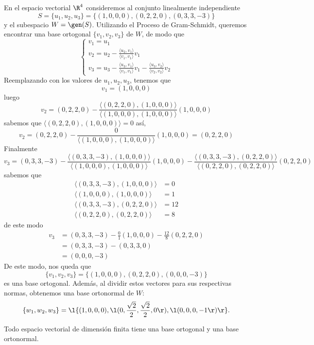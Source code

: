 \documentclass[compacto,10pt]{pubciencias-notas}
\begin{document}
\begin{ejem}\hspace{0pt} En el espacio vectorial $\R^{4}$ consideremos al conjunto linealmente independiente  
\[
    S = \{u_{1}, u_{2}, u_{3}\} = \{(1,0,0,0), (0,2,2,0), (0, 3, 3, - 3)\}
\]
y el subespacio $W = \gen(S)$. Utilizando el Proceso de Gram-Schmidt, queremos encontrar una base ortogonal $\{v_{1}, v_{2}, v_{3}\}$  de $W$, de modo que \[
\begin{cases}
    v_1=u_1\\
    v_2=u_2-\frac{\langle u_2,v_1\rangle}{\langle v_1,v_1\rangle}v_1\\
    v_3=u_3-\frac{\langle u_3,v_1\rangle}{\langle v_1,v_1\rangle}v_1-\frac{\langle u_3,v_2\rangle}{\langle v_2,v_2\rangle}v_2
\end{cases}
\] 
Reemplazando con los valores de $u_{1}, u_{2}, u_{3}$, tenemos que 
\[
v_1=(1,0,0,0)
\]
luego \[
v_2=(0,2,2,0)-\frac{\langle (0,2,2,0),(1,0,0,0)\rangle}{\langle (1,0,0,0),(1,0,0,0)\rangle}(1,0,0,0)
\]
sabemos que $\langle (0,2,2,0),(1,0,0,0)\rangle=0$ así,
\[
v_2=(0,2,2,0)-\frac{0}{\langle (1,0,0,0),(1,0,0,0)\rangle}(1,0,0,0)=(0,2,2,0)
\]
Finalmente 
\[
v_3=(0, 3, 3, - 3)-\frac{\langle (0, 3, 3, - 3),(1,0,0,0)\rangle}{\langle (1,0,0,0),(1,0,0,0)\rangle}(1,0,0,0)-\frac{\langle (0, 3, 3, - 3),(0,2,2,0)\rangle}{\langle (0,2,2,0),(0,2,2,0)\rangle}(0,2,2,0)
\]
sabemos que 
\begin{align*}
    \langle (0, 3, 3, - 3),(1,0,0,0)\rangle&=0\\
    \langle (1,0,0,0),(1,0,0,0)\rangle&=1\\
    \langle (0, 3, 3, - 3),(0,2,2,0)\rangle&=12\\
    \langle (0,2,2,0),(0,2,2,0)\rangle&=8
\end{align*}
de este modo
\begin{align*}
v_3&=(0, 3, 3, - 3)-\frac{0}{1}(1,0,0,0)-\frac{12}{8}(0,2,2,0)\\
&=(0, 3, 3, - 3)-(0,3,3,0)\\
&=(0,0,0,-3)
\end{align*}
De este modo, nos queda que 
\[
    \{v_{1}, v_{2}, v_{3}\} = \{(1,0,0,0), (0,2,2,0), (0,0,0,- 3)\}
\]
es una base ortogonal. Además, al dividir estos vectores para sus respectivas normas, obtenemos una base ortonormal de $W$:
\[
    \{w_{1}, w_{2}, w_{3}\} = \l\{(1, 0, 0, 0), \l(0,\dfrac{\sqrt{2}}{2},\dfrac{\sqrt{2}}{2},0\r), \l(0,0,0, - 1\r)\r\}.
\]
\end{ejem}

\begin{teo}
    Todo espacio vectorial de dimensión finita tiene una base ortogonal y una base ortonormal.
\end{teo}
\end{document}
